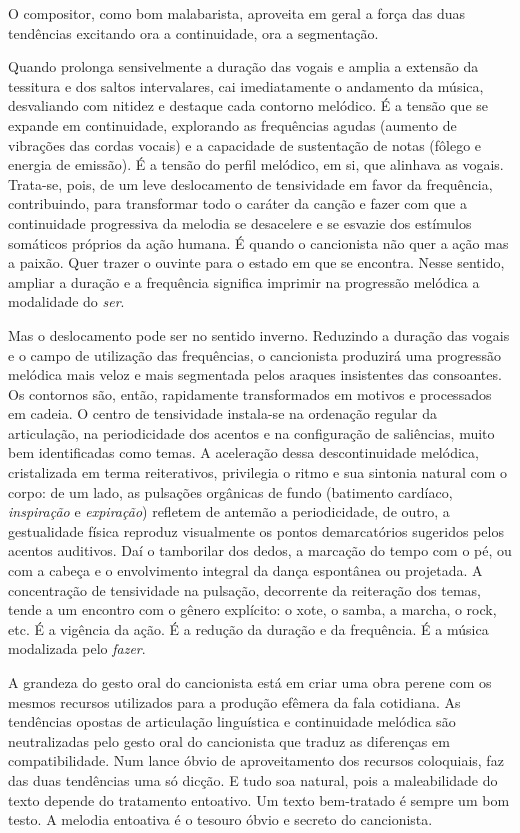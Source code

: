 O compositor, como bom malabarista, aproveita em geral a força das duas
tendências excitando ora a continuidade, ora a segmentação.

Quando prolonga sensivelmente a duração das vogais e amplia a extensão
da tessitura e dos saltos intervalares, cai imediatamente o andamento da
música, desvaliando com nitidez e destaque cada contorno melódico. É a
tensão que se expande em continuidade, explorando as frequências agudas
(aumento de vibrações das cordas vocais) e a capacidade de sustentação
de notas (fôlego e energia de emissão). É a tensão do perfil melódico,
em si, que alinhava as vogais. Trata-se, pois, de um leve deslocamento
de tensividade em favor da frequência, contribuindo, para transformar
todo o caráter da canção e fazer com que a continuidade progressiva da
melodia se desacelere e se esvazie dos estímulos somáticos próprios da
ação humana. É quando o cancionista não quer a ação mas a paixão. Quer
trazer o ouvinte para o estado em que se encontra. Nesse sentido,
ampliar a duração e a frequência significa imprimir na progressão
melódica a modalidade do \textit{ser}.

Mas o deslocamento pode ser no sentido inverno. Reduzindo a duração das
vogais e o campo de utilização das frequências, o cancionista produzirá
uma progressão melódica mais veloz e mais segmentada pelos araques
insistentes das consoantes. Os contornos são, então, rapidamente
transformados em motivos e processados em cadeia. O centro de
tensividade instala-se na ordenação regular da articulação, na
periodicidade dos acentos e na configuração de saliências, muito bem
identificadas como temas. A aceleração dessa descontinuidade melódica,
cristalizada em terma reiterativos, privilegia o ritmo e sua sintonia
natural com o corpo: de um lado, as pulsações orgânicas de fundo
(batimento cardíaco, \textit{inspiração} e \textit{expiração}) refletem de antemão a
periodicidade, de outro, a gestualidade física reproduz visualmente os
pontos demarcatórios sugeridos pelos acentos auditivos. Daí o tamborilar
dos dedos, a marcação do tempo com o pé, ou com a cabeça e o
envolvimento integral da dança espontânea ou projetada. A concentração
de tensividade na pulsação, decorrente da reiteração dos temas, tende a
um encontro com o gênero explícito: o xote, o samba, a marcha, o rock,
etc. É a vigência da ação. É a redução da duração e da
frequência. É a música modalizada pelo \textit{fazer}.

A grandeza do gesto oral do cancionista está em criar uma obra perene
com os mesmos recursos utilizados para a produção efêmera da fala
cotidiana. As tendências opostas de articulação linguística e
continuidade melódica são neutralizadas pelo gesto oral do cancionista
que traduz as diferenças em compatibilidade. Num lance óbvio de
aproveitamento dos recursos coloquiais, faz das duas tendências uma só
dicção. E tudo soa natural, pois a maleabilidade do texto depende do
tratamento entoativo. Um texto bem-tratado é sempre um bom testo. A
melodia entoativa é o tesouro óbvio e secreto do cancionista.

